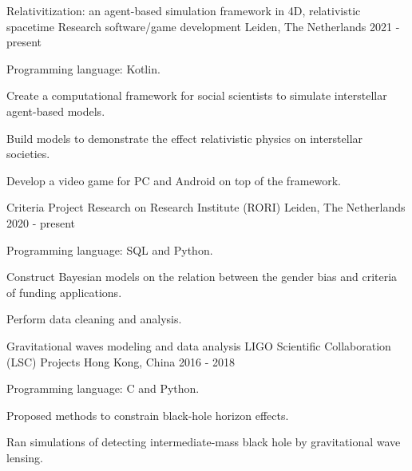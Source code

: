 

\begin{cventries}

  \cventry
    {Relativitization: an agent-based simulation framework in 4D, relativistic spacetime} %
    {Research software/game development} %
    {Leiden, The Netherlands} %
    {2021 - present} %
    {
      \begin{cvitems} %
        \item {Programming language: Kotlin.}
        \item {Create a computational framework for social scientists to simulate interstellar agent-based models.}
        \item {Build models to demonstrate the effect relativistic physics on interstellar societies.}
        \item {Develop a video game for PC and Android on top of the framework.}
      \end{cvitems}
    }

  \cventry
    {Criteria Project} %
    {Research on Research Institute (RORI)} %
    {Leiden, The Netherlands} %
    {2020 - present} %
    {
      \begin{cvitems} %
        \item {Programming language: SQL and Python.}
        \item {Construct Bayesian models on the relation between the gender bias and criteria of funding applications.}
        \item {Perform data cleaning and analysis.}
      \end{cvitems}
    }

  \cventry
    {Gravitational waves modeling and data analysis} %
    {LIGO Scientific Collaboration (LSC) Projects} %
    {Hong Kong, China} %
    {2016 - 2018} %
    {
      \begin{cvitems} %
        \item {Programming language: C and Python.}
        \item {Proposed methods to constrain black-hole horizon effects.}
        \item {Ran simulations of detecting intermediate-mass black hole by gravitational wave lensing.}
      \end{cvitems}
    }


\end{cventries}

